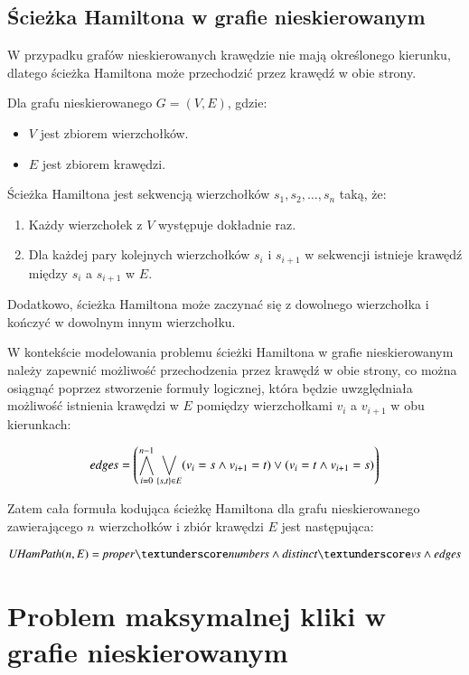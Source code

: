 


\subsection{Ścieżka Hamiltona w grafie nieskierowanym}

W przypadku grafów nieskierowanych krawędzie nie mają określonego kierunku, dlatego ścieżka Hamiltona może przechodzić przez krawędź w obie strony. 

Dla grafu nieskierowanego $G = (V, E)$, gdzie:
\begin{itemize}
	\item \(V\) jest zbiorem wierzchołków.
	\item \(E\) jest zbiorem krawędzi.
\end{itemize}
Ścieżka Hamiltona jest sekwencją wierzchołków $s_1, s_2, …, s_n$ taką, że:
\begin{enumerate}
	\item Każdy wierzchołek z \(V\) występuje dokładnie raz.
	\item Dla każdej pary kolejnych wierzchołków \(s_i\) i \(s_{i+1}\) w sekwencji istnieje krawędź między \(s_i\) a \(s_{i+1}\) w \(E\). 
\end{enumerate}

Dodatkowo, ścieżka Hamiltona może zaczynać się z dowolnego wierzchołka i kończyć w dowolnym innym wierzchołku.

W kontekście modelowania problemu ścieżki Hamiltona w grafie nieskierowanym należy zapewnić możliwość przechodzenia przez krawędź w obie strony, co można osiągnąć poprzez stworzenie formuły logicznej, która będzie uwzględniała możliwość istnienia krawędzi w \(E\) pomiędzy wierzchołkami \(v_i\) a \(v_{i+1}\) w obu kierunkach:

\begin{align*}
	{\mathit{edges}} = \left( \bigwedge_{i=0}^{n-1} \bigvee_{\{s,t\} \in E} (v_i = s \land v_{i+1} = t) \lor (v_i = t \land v_{i+1} = s) \right)
\end{align*}


Zatem cała formuła kodująca ścieżkę Hamiltona dla grafu nieskierowanego zawierającego \(n\) wierzchołków i zbiór krawędzi \(E\) jest następująca:

\begin{align*}
	\UHamPath(n, E) = \propernumbers \land \distinctvs \land \edges
\end{align*}


\section{Problem maksymalnej kliki w grafie nieskierowanym}

